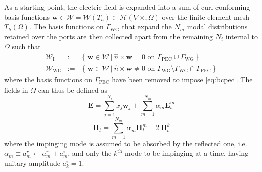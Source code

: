 \documentclass[journal,twoside,letterpaper]{IEEEtran}
\renewcommand{\vec}[1]{\mathbf{#1}}
\begin{document}
As a starting point, the electric field is expanded into a sum of  curl-conforming basis functions $\vec{w} \in \mathcal{W} = \mathcal{W}(T_h) \subset \mathcal{H}(\nabla \times, \Omega)$ \cite{ingelstrom2006new} over the finite element mesh $T_h(\Omega)$. The basis functions on $\Gamma_\text{WG}$ that expand the $N_m$ modal distributions retained over the ports are then collected apart from the remaining $N_i$ internal to $\Omega$ such that 
\begin{eqnarray*}
\mathcal{W}_\text{I} & := & \left\lbrace \vec{w} \in \mathcal{W} \ | \ \hat{n} \times \vec{w} = 0 \text{ on } \Gamma_\text{PEC} \cup \Gamma_\text{WG}  \right\rbrace\\
\mathcal{W}_\text{WG} & := & \left\lbrace \vec{w} \in \mathcal{W} \ | \  \hat{n} \times \vec{w} \neq 0 \text{ on } \Gamma_\text{WG} \setminus \Gamma_\text{WG} \cap \Gamma_\text{PEC} \right\rbrace
\end{eqnarray*}
\noindent where the basis functions on $\Gamma_\text{PEC}$ have been removed to impose \eqref{eq:bcpec}. The fields in $\Omega$ can thus be defined as \cite{ZhuCangellaris}
\begin{equation}
\label{eq:basisE}
\vec{E} = \sum_{j=1}^{N_i} x_j \vec{w}_j + \sum_{m=1}^{N_m} \alpha_m \vec{E}_t^m
\end{equation}
\begin{equation*}
\label{eq:basisH}
\vec{H}_t = \sum_{m=1}^{N_m} \alpha_m \vec{H}_t^m - 2 \ \vec{H}_t^k
\end{equation*}
\noindent where the impinging mode is assumed to be absorbed by the reflected one, i.e. $\alpha_m \equiv a_m^r \leftarrow a_m^r + a_m^i$, and only the $k^\text{th}$ mode to be impinging at a time, having unitary amplitude $a_k^i = 1$.
\end{document}

